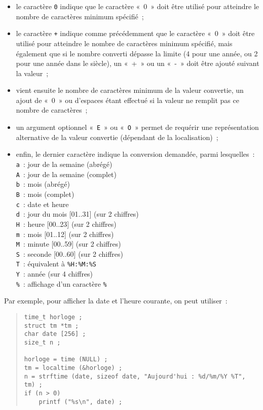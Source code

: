 \documentclass [twoside] {report}
\begin{document}
\begin {itemize}
    \item le caractère {\tt 0} indique que le caractère «~0~»
	doit être utilisé pour atteindre le nombre de caractères
	minimum spécifié~;

    \item le caractère {\tt +} indique comme précédemment que
	le caractère «~0~» doit être utilisé pour atteindre le
	nombre de caractères minimum spécifié, mais également que
	si le nombre converti dépasse la limite (4 pour une année,
	ou 2 pour une année dans le siècle), un «~+~» ou un «~-~»
	doit être ajouté suivant la valeur~;

    \item vient ensuite le nombre de caractères minimum de la valeur
	convertie, un ajout de «~0~» ou d'espaces étant effectué si
	la valeur ne remplit pas ce nombre de caractères~;

    \item un argument optionnel «~\texttt {E}~» ou «~\texttt {O}~»
	permet de requérir une représentation alternative de la valeur
	convertie (dépendant de la localisation)~;

    \item enfin, le dernier caractère indique la conversion demandée,
	parmi lesquelles~: \\
	{\tt a}~: jour de la semaine (abrégé) \\
	{\tt A}~: jour de la semaine (complet) \\
	{\tt b}~: mois (abrégé) \\
	{\tt B}~: mois (complet) \\
	{\tt c}~: date et heure \\
	{\tt d}~: jour du mois [01..31] (sur 2 chiffres) \\
	{\tt H}~: heure [00..23] (sur 2 chiffres) \\
	{\tt m}~: mois [01..12] (sur 2 chiffres) \\
	{\tt M}~: minute [00..59] (sur 2 chiffres) \\
	{\tt S}~: seconde [00..60] (sur 2 chiffres) \\
	{\tt T}~: équivalent à \verb|%H:%M:%S| \\
	{\tt Y}~: année (sur 4 chiffres) \\
	{\tt \%}~: affichage d'un caractère {\tt \%}

\end {itemize}

Par exemple, pour afficher la date et l'heure courante, on peut utiliser~:
\begin {quote}
\begin {verbatim}
time_t horloge ;
struct tm *tm ;
char date [256] ;
size_t n ;

horloge = time (NULL) ;
tm = localtime (&horloge) ;
n = strftime (date, sizeof date, "Aujourd'hui : %
if (n > 0)
    printf ("%
\end{verbatim}
\end {quote}
\end{document}
